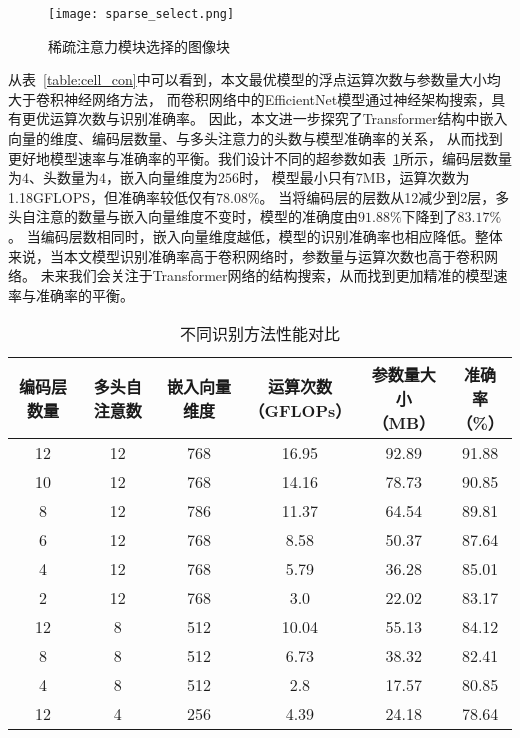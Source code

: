 \begin{figure} 
  \centering   
  \texttt{[image: sparse\_select.png]}   
  \caption{稀疏注意力模块选择的图像块}   
  \label{fig:sparse_select} 
\end{figure}  

从表~\ref{table:cell_con}中可以看到，本文最优模型的浮点运算次数与参数量大小均大于卷积神经网络方法，
而卷积网络中的EfficientNet模型通过神经架构搜索，具有更优运算次数与识别准确率。
因此，本文进一步探究了Transformer结构中嵌入向量的维度、编码层数量、与多头注意力的头数与模型准确率的关系，
从而找到更好地模型速率与准确率的平衡。我们设计不同的超参数如表~\ref{table:detect_con}所示，编码层数量为$4$、头数量为$4$，嵌入向量维度为$256$时，
模型最小只有7MB，运算次数为1.18GFLOPS，但准确率较低仅有$78.08\%$。
当将编码层的层数从12减少到2层，多头自注意的数量与嵌入向量维度不变时，模型的准确度由$91.88\%$下降到了$83.17\%$。
当编码层数相同时，嵌入向量维度越低，模型的识别准确率也相应降低。整体来说，当本文模型识别准确率高于卷积网络时，参数量与运算次数也高于卷积网络。
未来我们会关注于Transformer网络的结构搜索，从而找到更加精准的模型速率与准确率的平衡。

\begin{table}
  \caption{不同识别方法性能对比}   
  \centering 
  \label{table:detect_con}
  \begin{tabular}{cccccc}
    \toprule[2pt]
    编码层数量 & 多头自注意数 & 嵌入向量维度 &  \makecell{运算次数 \\（GFLOPs）} & \makecell{参数量大小\\（MB）} & \makecell{准确率 \\（\%）} \\
    \midrule[1.5pt] 
        12 & 12 & 768 & 16.95 & 92.89 & 91.88 \\
        10 & 12 & 768 & 14.16 & 78.73 & 90.85  \\
        8 & 12 & 786 & 11.37 & 64.54 & 89.81  \\
        6 & 12 & 768 & 8.58 & 50.37 & 87.64 \\
        4 & 12 & 768 & 5.79 & 36.28 & 85.01  \\
        2 & 12 & 768 & 3.0 & 22.02 & 83.17 \\
        12 & 8 & 512 & 10.04 & 55.13 & 84.12 \\ 
        8 & 8 & 512 & 6.73 & 38.32 & 82.41 \\
        4 & 8 & 512 & 2.8 & 17.57 & 80.85  \\
        12 & 4 & 256 & 4.39 & 24.18 & 78.64 \\
    \bottomrule[2pt]      
  \end{tabular} 
\end{table}

